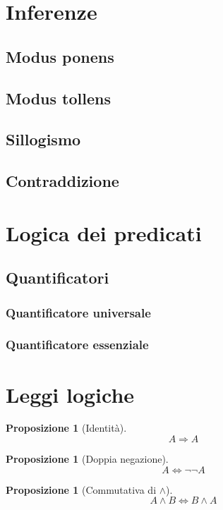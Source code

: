 \documentclass[a4paper,12pt]{article}
\theoremstyle{mystyle}
\newtheorem{proposition}[theorem]{Proposizione}
\begin{document}
\section{Inferenze}
\subsection{Modus ponens}
\subsection{Modus tollens}
\subsection{Sillogismo}
\subsection{Contraddizione}

\section{Logica dei predicati}
\subsection{Quantificatori}
\subsubsection{Quantificatore universale}
\subsubsection{Quantificatore essenziale}

\section{Leggi logiche}

\begin{proposition}[Identità]
    \[
        A \Rightarrow A
    \]
\end{proposition}

\begin{proposition}[Doppia negazione]
    \[
        A \Leftrightarrow \neg \neg A
    \]
\end{proposition}

\begin{proposition}[Commutativa di \(\land\)]
    \[
        A \land B \Leftrightarrow B \land A
    \]
\end{proposition}
\end{document}
